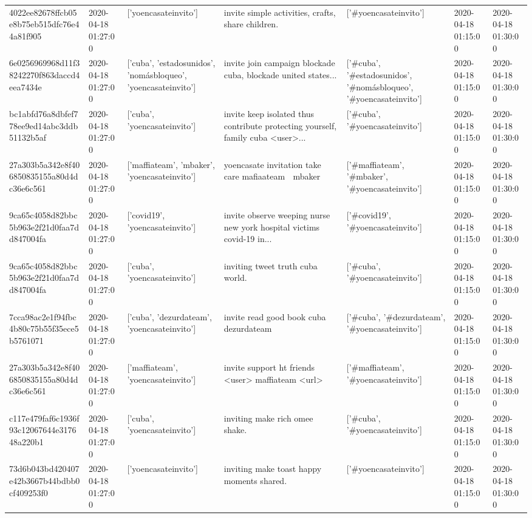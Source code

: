 \begin{tabular}{lllllll}
4022ee82678ffcb05e8b75eb515dfc76e44a81f905 & 2020-04-18 01:27:00 & ['yoencasateinvito'] & invite simple activities, crafts, share children. & ['#yoencasateinvito'] & 2020-04-18 01:15:00 & 2020-04-18 01:30:00 \\
6e0256969968d11f38242270f863daccd4eea7434e & 2020-04-18 01:27:00 & ['cuba', 'estadosunidos', 'nomásbloqueo', 'yoencasateinvito'] & invite join campaign blockade cuba, blockade united states... & ['#cuba', '#estadosunidos', '#nomásbloqueo', '#yoencasateinvito'] & 2020-04-18 01:15:00 & 2020-04-18 01:30:00 \\
bc1abfd76a8dbfef778ee9ed14abc3ddb51132b5af & 2020-04-18 01:27:00 & ['cuba', 'yoencasateinvito'] & invite keep isolated thus contribute protecting yourself, family cuba <user>... & ['#cuba', '#yoencasateinvito'] & 2020-04-18 01:15:00 & 2020-04-18 01:30:00 \\
27a303b5a342e8f406850835155a80d4dc36e6c561 & 2020-04-18 01:27:00 & ['maffiateam', 'mbaker', 'yoencasateinvito'] & yoencasate invitation take care mafiaateam 💖 mbaker & ['#maffiateam', '#mbaker', '#yoencasateinvito'] & 2020-04-18 01:15:00 & 2020-04-18 01:30:00 \\
9ca65c4058d82bbc5b963e2f21d0faa7dd847004fa & 2020-04-18 01:27:00 & ['covid19', 'yoencasateinvito'] & invite observe weeping nurse new york hospital victims covid-19 in... & ['#covid19', '#yoencasateinvito'] & 2020-04-18 01:15:00 & 2020-04-18 01:30:00 \\
9ca65c4058d82bbc5b963e2f21d0faa7dd847004fa & 2020-04-18 01:27:00 & ['cuba', 'yoencasateinvito'] & inviting tweet truth cuba world. & ['#cuba', '#yoencasateinvito'] & 2020-04-18 01:15:00 & 2020-04-18 01:30:00 \\
7cca98ac2e1f94fbc4b80c75b55f35ece5b5761071 & 2020-04-18 01:27:00 & ['cuba', 'dezurdateam', 'yoencasateinvito'] & invite read good book cuba dezurdateam & ['#cuba', '#dezurdateam', '#yoencasateinvito'] & 2020-04-18 01:15:00 & 2020-04-18 01:30:00 \\
27a303b5a342e8f406850835155a80d4dc36e6c561 & 2020-04-18 01:27:00 & ['maffiateam', 'yoencasateinvito'] & invite support ht friends <user> maffiateam <url> & ['#maffiateam', '#yoencasateinvito'] & 2020-04-18 01:15:00 & 2020-04-18 01:30:00 \\
c117e479faf6c1936f93c12067644e317648a220b1 & 2020-04-18 01:27:00 & ['cuba', 'yoencasateinvito'] & inviting make rich omee shake. & ['#cuba', '#yoencasateinvito'] & 2020-04-18 01:15:00 & 2020-04-18 01:30:00 \\
73d6b043bd420407e42b3667b44bdbb0cf409253f0 & 2020-04-18 01:27:00 & ['yoencasateinvito'] & inviting make toast happy moments shared. & ['#yoencasateinvito'] & 2020-04-18 01:15:00 & 2020-04-18 01:30:00 \\

\end{tabular}
